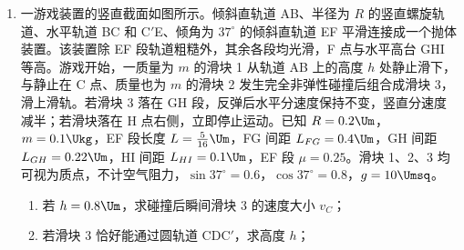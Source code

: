 \documentclass[\gkver]{gaokaozhenti}
\begin{document}
\begin{enumerate}
{（2）气体从状态 1 到状态 2 的过程，由盖—吕萨克定律

$\frac{V_{1}}{T_{1}} = \frac{V_{2}}{T_{2}}$

其中 $V_{1} = 1 \times 10^{3} \Ucmc$，$T_{1} = 300 \UK$，$T_{2} = 303 \UK$

解得 $V_{2} = 1.01 \times 10^{3} \Ucmc$

此时气体压强为 $p_{2} = p_{1} = p_{0} + \rho gh = 1.01 \times 10^{5} \UPa$

气体从状态 2 到状态 3 的过程，由玻意耳定律

$p_{2}V_{2} = p_{3}V_{3}$

其中 $p_{3} = p_{0}$

代入数据解得，气体在状态 3 的体积为

$V_{3} = 1.0201 \times 10^{3} \Ucmc$

（3）气体从状态 1 到状态 2 的过程中，气体对外做功为

$W_{1} = p_{1}(V_{2} - V_{1}) = 1.01 \UJ$

由热力学第一定律

$\Delta U = Q - (W_{1} + W_{2})$

其中 $Q = 4.56 \UJ$，$W_{2} = 1.02 \UJ$

代入解得，从状态 1 到状态 3 气体内能的改变量为 $\Delta U = 2.53 \UJ$
}

\item
一游戏装置的竖直截面如图所示。倾斜直轨道 AB、半径为 $R$ 的竖直螺旋轨道、水平轨道 BC 和 C$'$E、倾角为 $37^{\circ}$ 的倾斜直轨道 EF 平滑连接成一个抛体装置。该装置除 EF 段轨道粗糙外，其余各段均光滑，F 点与水平高台 GHI 等高。游戏开始，一质量为 $m$ 的滑块 1 从轨道 AB 上的高度 $h$ 处静止滑下，与静止在 C 点、质量也为 $m$ 的滑块 2 发生完全非弹性碰撞后组合成滑块 3，滑上滑轨。若滑块 3 落在 GH 段，反弹后水平分速度保持不变，竖直分速度减半；若滑块落在 H 点右侧，立即停止运动。已知 $R = 0.2 \Um$，$m = 0.1 \Ukg$，EF 段长度 $L = \frac{5}{16} \Um$，FG 间距 $L_{FG} = 0.4 \Um$，GH 间距 $L_{GH} = 0.22 \Um$，HI 间距 $L_{HI} = 0.1 \Um$，EF 段 $\mu = 0.25$。滑块 1、2、3 均可视为质点，不计空气阻力，$\sin37^{\circ} = 0.6$，$\cos37^{\circ} = 0.8$，$g = 10 \Umsq$。

\begin{enumerate}
\item
若 $h = 0.8 \Um$，求碰撞后瞬间滑块 3 的速度大小 $v_{C}$；

\item
若滑块 3 恰好能通过圆轨道 CDC$'$，求高度 $h$；


\end{enumerate}
\end{enumerate}
\end{document}
